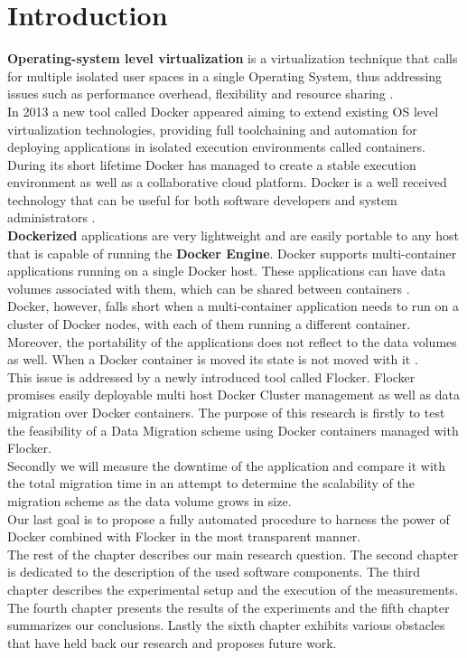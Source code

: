 \documentclass{article}
\begin{document}
\clearpage
\tableofcontents


\clearpage
\section{Introduction}
\textbf{Operating-system level virtualization} is a virtualization technique that calls for multiple isolated user spaces in a single Operating System, thus addressing issues such as performance overhead, flexibility and resource sharing \cite{os-level}.\\
In 2013 a new tool called Docker appeared aiming to extend existing OS level virtualization technologies, providing full toolchaining and automation for deploying applications in isolated execution environments called containers.\\
During its short lifetime Docker has managed to create a stable execution environment as well as a collaborative cloud platform. Docker is a well received technology \cite{Docker-usecases} that can be useful for both software developers and system administrators \cite{docker-whatis}.\\
\textbf{Dockerized} applications are very lightweight and are easily portable to any host that is capable of running the \textbf{Docker Engine}. Docker supports multi-container applications running on a single Docker host. These applications can have data volumes associated with them, which can be shared between containers \cite{docker-volumes}.\\
Docker, however, falls short when a multi-container application needs to run on a cluster of Docker nodes, with each of them running a different container. Moreover, the portability of the applications does not reflect to the data volumes as well. When a Docker container is moved its state is not moved with it \cite{flocker-article}.\\
This issue is addressed by a newly introduced tool called Flocker. Flocker promises easily deployable multi host Docker Cluster management as well as data migration over Docker containers.
The purpose of this research is firstly to test the feasibility of a Data Migration scheme using Docker containers managed with Flocker.\\
Secondly we will measure the downtime of the application and compare it with the total migration time in an attempt to determine the scalability of the migration scheme as the data volume grows in size.\\
Our last goal is to propose a fully automated procedure to harness the power of Docker combined with Flocker in the most transparent manner.\\
The rest of the chapter describes our main research question. The second chapter is dedicated to the description of the used software components. The third chapter describes the experimental setup and the execution of the measurements. The fourth chapter presents the results of the experiments and the fifth chapter summarizes our conclusions. Lastly the sixth chapter exhibits various obstacles that have held back our research and proposes future work.
\end{document}
